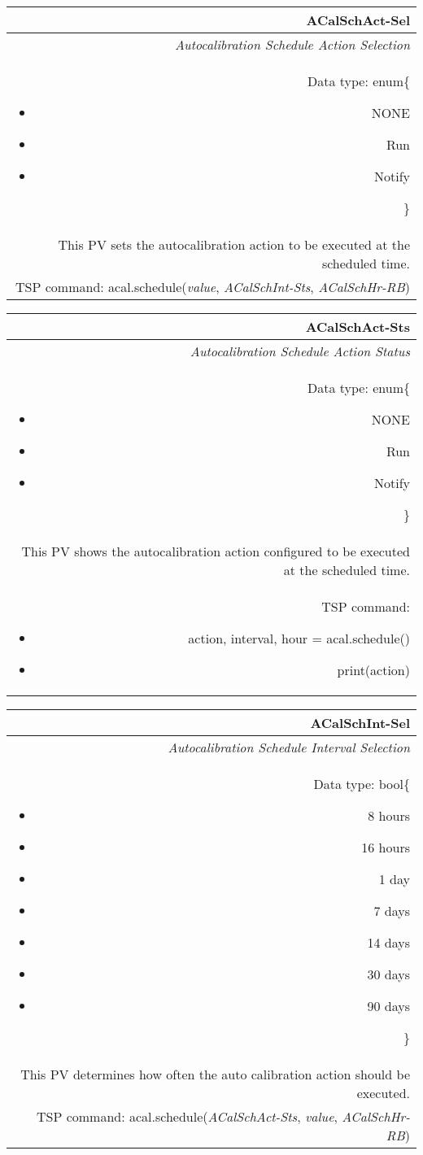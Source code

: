 \documentclass[openany]{article}
\begin{document}
		\begin{tabular}{N}
			\hline
			\bfseries ACalSchAct-Sel\label{pv:acalschact-sel} \\ \hline
			\emph{Autocalibration Schedule Action Selection} \\
			Data type: enum\{\begin{itemize}[noitemsep]
				\small
				\item[] NONE
				\item[] Run
				\item[] Notify
			\end{itemize}\} \\
			This PV sets the autocalibration action to be executed at the scheduled time. \\
			TSP command: acal.schedule(\emph{value}, \emph{ACalSchInt-Sts}, \emph{ACalSchHr-RB})
		\end{tabular}

		\begin{tabular}{N}
			\hline
			\bfseries ACalSchAct-Sts\label{pv:acalschact-sts} \\ \hline
			\emph{Autocalibration Schedule Action Status} \\
			Data type: enum\{\begin{itemize}[noitemsep]
				\small
				\item[] NONE
				\item[] Run
				\item[] Notify
			\end{itemize}\} \\
			This PV shows the autocalibration action configured to be executed at the scheduled time. \\
			TSP command: \begin{itemize} \item[] action, interval, hour = acal.schedule() \item[] print(action) \end{itemize}
		\end{tabular}

		\begin{tabular}{N}
			\hline
			\bfseries ACalSchInt-Sel\label{pv:acalschint-sel} \\ \hline
			\emph{Autocalibration Schedule Interval Selection} \\
			Data type: bool\{\begin{itemize}[noitemsep]
				\small
				\item[] 8 hours
				\item[] 16 hours
				\item[] 1 day
				\item[] 7 days
				\item[] 14 days
				\item[] 30 days
				\item[] 90 days
			\end{itemize}\} \\
			This PV determines how often the auto calibration action should be executed. \\
			TSP command: acal.schedule(\emph{ACalSchAct-Sts}, \emph{value}, \emph{ACalSchHr-RB})
		\end{tabular}
\end{document}
